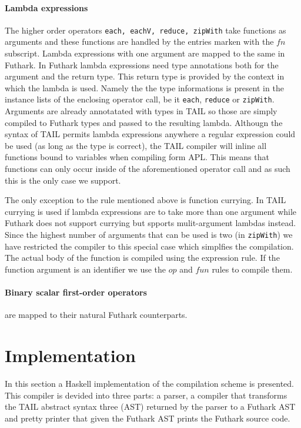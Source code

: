 \documentclass[11pt]{article}
\begin{document}
\paragraph{Lambda expressions} 

The higher order operators {\tt each, eachV, reduce, zipWith} take functions as arguments and these functions are handled by the
entries marken with the $fn$ subscript. Lambda expressions with one argument are mapped to the same in Futhark.
In Futhark lambda expressions need type annotations both for the argument and the return type. This return type is provided by
the context in which the lambda is used. Namely the the type informations is present in the instance lists of the 
enclosing operator call, be it {\tt each}, {\tt reduce} or {\tt zipWith}. Arguments are already annotatated with types in TAIL so
those are simply compiled to Futhark types and passed to the resulting lambda.
Althougn the syntax of TAIL permits lambda expressions anywhere a regular expression could be used (as long as the type is correct),
the TAIL compiler will inline all functions bound to variables when compiling form APL. This means that functions can only occur
inside of the aforementioned operator call and as such this is the only case we support.

The only exception to the rule mentioned above is function currying.
In TAIL currying is used if lambda expressions are to take more than one argument while Futhark does not support currying but
spports mulit-argument lambdas instead. Since the highest number of arguments that can be used is two (in {\tt zipWith}) we have
restricted the compiler to this special case which simplfies the compilation.
The actual body of the function is compiled using the expression rule.
If the function argument is an identifier we use the $op$ and $fun$ rules to compile them.


\paragraph{Binary scalar first-order operators} are mapped to their natural Futhark counterparts.

\section{Implementation}
\label{sec:impl}
In this section a Haskell implementation of the compilation scheme is presented. This compiler is devided into three parts: a parser, a compiler that transforms the TAIL abstract syntax three (AST) returned by the parser to a Futhark AST and pretty printer that given the Futhark AST prints the Futhark source code. 
\end{document}
